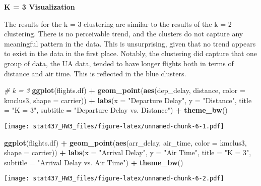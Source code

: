 \documentclass[
]{article}
\newenvironment{Shaded}{\begin{snugshade}}{\end{snugshade}}
\newcommand{\AttributeTok}[1]{\textcolor[rgb]{0.13,0.29,0.53}{#1}}
\newcommand{\CommentTok}[1]{\textcolor[rgb]{0.56,0.35,0.01}{\textit{#1}}}
\newcommand{\FunctionTok}[1]{\textcolor[rgb]{0.13,0.29,0.53}{\textbf{#1}}}
\newcommand{\NormalTok}[1]{#1}
\newcommand{\SpecialCharTok}[1]{\textcolor[rgb]{0.81,0.36,0.00}{\textbf{#1}}}
\newcommand{\StringTok}[1]{\textcolor[rgb]{0.31,0.60,0.02}{#1}}
\begin{document}
\textbf{K = 3 Visualization}

The results for the k = 3 clustering are similar to the results of the k
= 2 clustering. There is no perceivable trend, and the clusters do not
capture any meaningful pattern in the data. This is unsurprising, given
that no trend appears to exist in the data in the first place. Notably,
the clustering did capture that one group of data, the UA data, tended
to have longer flights both in terms of distance and air time. This is
reflected in the blue clusters.

\begin{Shaded}
\begin{Highlighting}[]
\CommentTok{\# k = 3}
\FunctionTok{ggplot}\NormalTok{(flights.df) }\SpecialCharTok{+} \FunctionTok{geom\_point}\NormalTok{(}\FunctionTok{aes}\NormalTok{(dep\_delay, distance, }\AttributeTok{color =}\NormalTok{ kmclus3,}
    \AttributeTok{shape =}\NormalTok{ carrier)) }\SpecialCharTok{+} \FunctionTok{labs}\NormalTok{(}\AttributeTok{x =} \StringTok{"Departure Delay"}\NormalTok{, }\AttributeTok{y =} \StringTok{"Distance"}\NormalTok{,}
    \AttributeTok{title =} \StringTok{"K = 3"}\NormalTok{, }\AttributeTok{subtitle =} \StringTok{"Departure Delay vs. Distance"}\NormalTok{) }\SpecialCharTok{+}
    \FunctionTok{theme\_bw}\NormalTok{()}
\end{Highlighting}
\end{Shaded}

\texttt{[image: stat437\_HW3\_files/figure-latex/unnamed-chunk-6-1.pdf]}

\begin{Shaded}
\begin{Highlighting}[]
\FunctionTok{ggplot}\NormalTok{(flights.df) }\SpecialCharTok{+} \FunctionTok{geom\_point}\NormalTok{(}\FunctionTok{aes}\NormalTok{(arr\_delay, air\_time, }\AttributeTok{color =}\NormalTok{ kmclus3,}
    \AttributeTok{shape =}\NormalTok{ carrier)) }\SpecialCharTok{+} \FunctionTok{labs}\NormalTok{(}\AttributeTok{x =} \StringTok{"Arrival Delay"}\NormalTok{, }\AttributeTok{y =} \StringTok{"Air Time"}\NormalTok{,}
    \AttributeTok{title =} \StringTok{"K = 3"}\NormalTok{, }\AttributeTok{subtitle =} \StringTok{"Arrival Delay vs. Air Time"}\NormalTok{) }\SpecialCharTok{+}
    \FunctionTok{theme\_bw}\NormalTok{()}
\end{Highlighting}
\end{Shaded}

\texttt{[image: stat437\_HW3\_files/figure-latex/unnamed-chunk-6-2.pdf]}
\end{document}
